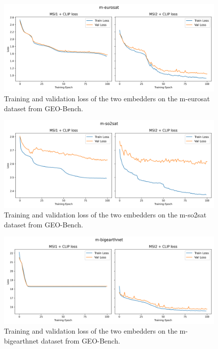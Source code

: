 \documentclass[a4paper, oneside, english]{sapthesis} %
\begin{document}
\begin{figure}[h]
    \centering
    \includegraphics[width=\textwidth]{img/m-eurosat_loss_plot.png}
    \caption{Training and validation loss of the two embedders on the m-eurosat dataset from GEO-Bench.}
    \label{fig:meurosatloss}
\end{figure}

\begin{figure}[h]
    \centering
    \includegraphics[width=\textwidth]{img/m-so2sat_loss_plot.png}
    \caption{Training and validation loss of the two embedders on the m-so2sat dataset from GEO-Bench.}
    \label{fig:so2satloss}
\end{figure}

\begin{figure}[h]
    \centering
    \includegraphics[width=\textwidth]{img/m-bigearthnet_loss_plot.png}
    \caption{Training and validation loss of the two embedders on the m-bigearthnet dataset from GEO-Bench.}
    \label{fig:benloss}
\end{figure}
\end{document}
